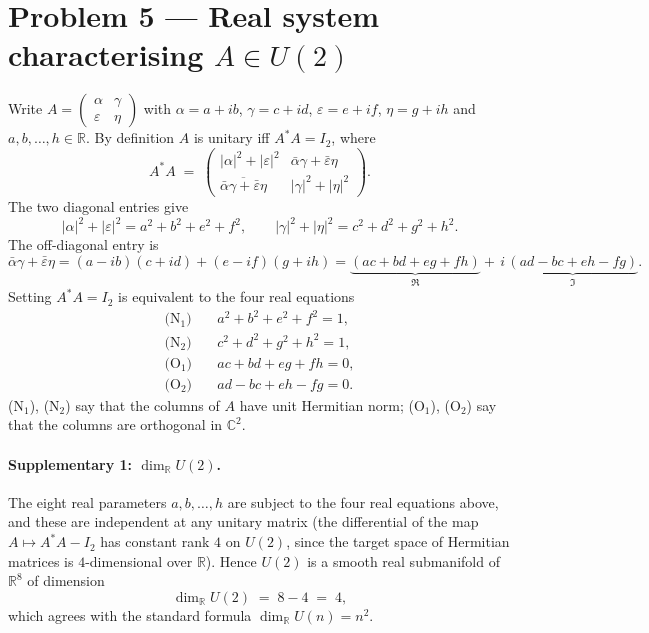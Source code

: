 \documentclass[11pt,a4paper]{article}
\newcommand{\R}{\mathbb{R}}
\newcommand{\C}{\mathbb{C}}
\begin{document}
\section*{Problem 5 --- Real system characterising $A\in U(2)$}

Write $A=\begin{pmatrix}\alpha & \gamma\\ \varepsilon & \eta\end{pmatrix}$ with $\alpha=a+ib$, $\gamma=c+id$, $\varepsilon=e+if$, $\eta=g+ih$ and $a,b,\dots,h\in\R$. By definition $A$ is unitary iff $A^{*}A=I_2$, where
\[
A^{*}A\;=\;\begin{pmatrix}
\lvert\alpha\rvert^{2}+\lvert\varepsilon\rvert^{2} & \bar\alpha\gamma+\bar\varepsilon\eta\\
\overline{\bar\alpha\gamma+\bar\varepsilon\eta} & \lvert\gamma\rvert^{2}+\lvert\eta\rvert^{2}
\end{pmatrix}.
\]
The two diagonal entries give
\[
\lvert\alpha\rvert^{2}+\lvert\varepsilon\rvert^{2}=a^{2}+b^{2}+e^{2}+f^{2},
\qquad
\lvert\gamma\rvert^{2}+\lvert\eta\rvert^{2}=c^{2}+d^{2}+g^{2}+h^{2}.
\]
The off-diagonal entry is
\[
\bar\alpha\gamma+\bar\varepsilon\eta
=(a-ib)(c+id)+(e-if)(g+ih)
=\underbrace{(ac+bd+eg+fh)}_{\Re}+\,i\,\underbrace{(ad-bc+eh-fg)}_{\Im}.
\]
Setting $A^{*}A=I_2$ is equivalent to the four real equations
\[
\boxed{\;\;
\begin{aligned}
\text{(N$_1$)}\quad & a^{2}+b^{2}+e^{2}+f^{2}=1,\\
\text{(N$_2$)}\quad & c^{2}+d^{2}+g^{2}+h^{2}=1,\\
\text{(O$_1$)}\quad & ac+bd+eg+fh=0,\\
\text{(O$_2$)}\quad & ad-bc+eh-fg=0.
\end{aligned}\;\;}
\]
(N$_1$), (N$_2$) say that the columns of $A$ have unit Hermitian norm; (O$_1$), (O$_2$) say that the columns are orthogonal in $\C^{2}$.

\paragraph{Supplementary 1: $\dim_{\R} U(2)$.}
The eight real parameters $a,b,\dots,h$ are subject to the four real equations above, and these are independent at any unitary matrix (the differential of the map $A\mapsto A^{*}A-I_2$ has constant rank $4$ on $U(2)$, since the target space of Hermitian matrices is $4$-dimensional over $\R$). Hence $U(2)$ is a smooth real submanifold of $\R^{8}$ of dimension
\[
\dim_{\R} U(2)\;=\;8-4\;=\;4,
\]
which agrees with the standard formula $\dim_{\R}U(n)=n^{2}$.
\end{document}
